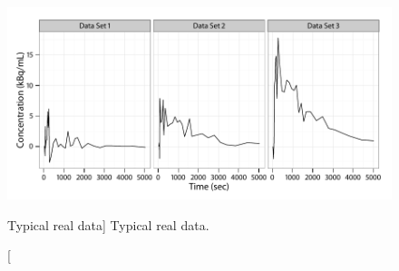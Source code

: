 \begin{figure}[t]
  \UseAltLinespread
  \includegraphics[width=\linewidth]{fig_src/Typical_PET}
  \caption
  [Typical real \protect\pet data]
  {Typical real \protect\pet data.}
  \label{fig:typical real pet}
\end{figure}
